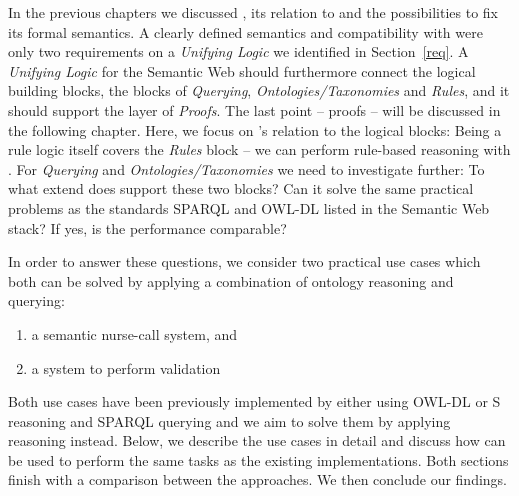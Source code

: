 In the previous chapters we discussed \nthreelogic, its relation to \rdf and the possibilities to fix its formal semantics. %
A clearly defined semantics and compatibility with \rdf were only two requirements on a \emph{Unifying Logic} we identified in Section~\ref{req}.
A \emph{Unifying Logic} for the Semantic Web should furthermore
connect the logical building blocks, \ie the blocks of \emph{Querying}, \emph{Ontologies/Taxonomies} and \emph{Rules}, and it should support the layer of \emph{Proofs}. 
The last point -- proofs -- will be discussed in the following chapter. Here, we focus on \nthree's relation to the logical blocks:
Being a rule logic itself \nthreelogic covers the \emph{Rules} block -- we can perform rule-based reasoning with \nthree.
For \emph{Querying} and \emph{Ontologies/Taxonomies} we need to investigate further: To what extend does \nthreelogic support these two blocks? 
Can it solve the same practical problems as the standards SPARQL and OWL-DL listed in the Semantic Web stack? If yes, is the performance comparable?

In order to answer these questions, we consider two practical use cases which both can be solved by applying a combination of ontology reasoning and querying:\begin{enumerate}
\item a semantic nurse-call system, and
\item a system to perform \rdf validation
\end{enumerate}
Both use cases have been previously implemented by either using OWL-DL or \rdf{}S reasoning and SPARQL querying and we aim to solve them by applying \nthree reasoning instead.
Below, we describe the use cases in detail and discuss how \nthree can 
be used to perform the same tasks as the existing implementations. Both sections finish with a comparison between the approaches. We then conclude our findings.
